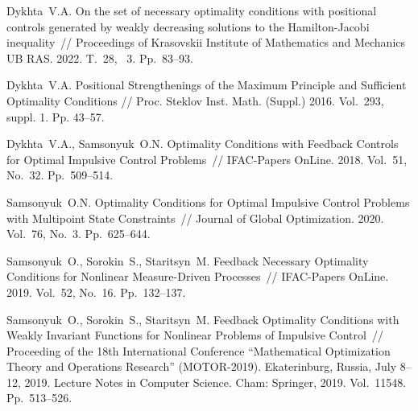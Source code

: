 \documentclass[12pt]{llncs}
\begin{document}
  

\begin{thebibliography}{9} 

 Dykhta~V.A. On the set of necessary optimality conditions with positional controls generated by weakly decreasing solutions to the Hamilton-Jacobi inequality~// Proceedings of Krasovskii Institute of Mathematics and Mechanics UB RAS. 2022. T.~28, \textnumero~3. Pp.~83--93.

  Dykhta~V.A.  Positional Strengthenings of the Maximum Principle and Sufficient Optimality Conditions // Proc. Steklov Inst. Math. (Suppl.) 2016. Vol.~293, suppl. 1. Pp. 43--57.

Dykhta~V.A., Samsonyuk~O.N. 
Optimality Conditions with Feedback Controls for Optimal Impulsive Control Problems~// 
IFAC-Papers OnLine. 2018. Vol.~51, No.~32. Pp.~509--514.

Samsonyuk~O.N. 
Optimality Conditions for Optimal Impulsive Control Problems with Multipoint State Constraints~// Journal of Global Optimization. 2020. Vol.~76, No.~3. Pp.~625--644. 

Samsonyuk~O., Sorokin~S., Staritsyn~M.
Feedback Necessary Optimality Conditions for Nonlinear Measure-Driven Processes~// 
IFAC-Papers OnLine. 2019. Vol.~52, No.~16. Pp.~132--137.


Samsonyuk~O., Sorokin~S., Staritsyn~M.
Feedback Optimality Conditions with Weakly Invariant Functions for Nonlinear Problems of Impulsive  Control~// Proceeding of the 18th International Conference ``Mathematical Optimization Theory and Operations Research'' (MOTOR-2019). Ekaterinburg, Russia, July 8–12, 2019. Lecture Notes in Computer Science. Cham: Springer, 2019. Vol.~11548. 
Pp.~513--526.


\end{thebibliography}
\end{document}
